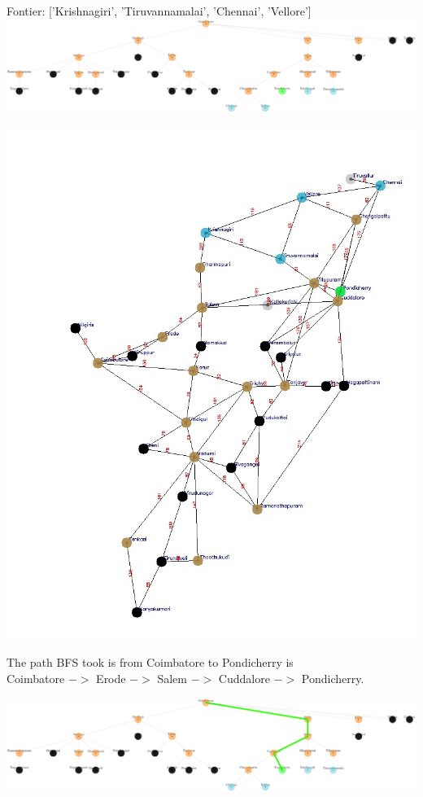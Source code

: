 \documentclass[xcolor=table]{beamer}
\begin{document}
\begin{frame}
  { \tiny Fontier: ['Krishnagiri', 'Tiruvannamalai', 'Chennai', 'Vellore']}
  \includegraphics[width=1\textwidth]{../BFSNodes/44-1.png}
  \begin{center}
    \includegraphics[height=0.6\textheight]{../BFSoutput/tamilBFS42.jpg}
  \end{center}
\end{frame}
\begin{frame}
  \quad The path BFS took is from Coimbatore to Pondicherry is\\
  Coimbatore $->$ Erode $->$ Salem $->$ Cuddalore $->$ Pondicherry.
  \begin{center}
    \includegraphics[width=1\textwidth]{../BFSNodes/BFSFINAL-1.png}
  \end{center}
\end{frame}
\end{document}
